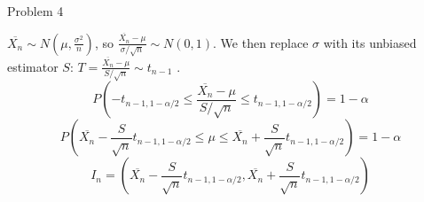 \documentclass[12pt,letterpaper, onecolumn]{exam}
\begin{document}
\begin{questions}
\begin{solution}
    \end{solution}
    \question Problem 4
    \begin{solution}
        $\overline{X_n} \sim N(\mu, \frac{\sigma^2}{n})$, so $\frac{\overline{X_n}-\mu}{\sigma/\sqrt{n}} \sim N(0,1)$. We then replace $\sigma$ with its unbiased estimator $S$: $T = \frac{\overline{X_n}-\mu}{S/\sqrt{n}} \sim t_{n-1}$ . 
        $$P(-t_{n-1, 1-\alpha/2} \leq  \frac{\overline{X_n}-\mu}{S/\sqrt{n}} \leq t_{n-1, 1-\alpha/2}) = 1-\alpha$$
        $$P(\overline{X_n}-\frac{S}{\sqrt{n}}t_{n-1, 1-\alpha/2} \leq  \mu \leq \overline{X_n}+\frac{S}{\sqrt{n}}t_{n-1, 1-\alpha/2}) = 1-\alpha$$
        $$I_n = (\overline{X_n}-\frac{S}{\sqrt{n}}t_{n-1, 1-\alpha/2}, \overline{X_n}+\frac{S}{\sqrt{n}}t_{n-1, 1-\alpha/2})$$
    \end{solution}
\end{questions}
\end{document}

